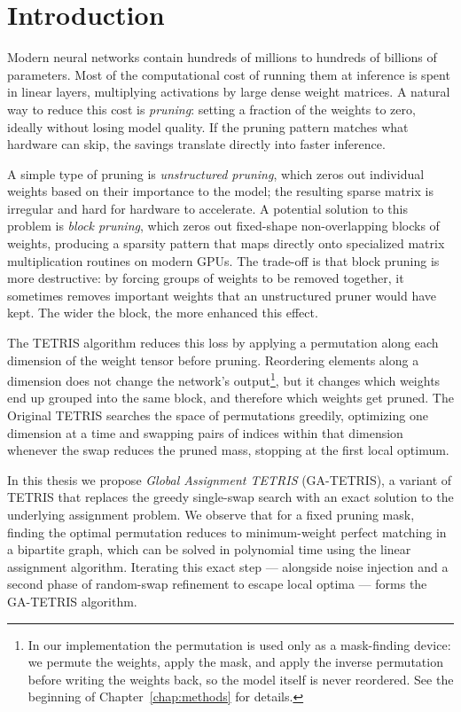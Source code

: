 \chapter*{Introduction} %

Modern neural networks contain hundreds of millions to hundreds of billions of parameters. Most of the computational cost of running them at inference is spent in linear layers, multiplying activations by large dense weight matrices. A natural way to reduce this cost is \emph{pruning}: setting a fraction of the weights to zero, ideally without losing model quality. If the pruning pattern matches what hardware can skip, the savings translate directly into faster inference.

A simple type of pruning is \emph{unstructured pruning}, which zeros out individual weights based on their importance to the model; the resulting sparse matrix is irregular and hard for hardware to accelerate. A potential solution to this problem is \emph{block pruning}, which zeros out fixed-shape non-overlapping blocks of weights, producing a sparsity pattern that maps directly onto specialized matrix multiplication routines on modern GPUs. The trade-off is that block pruning is more destructive: by forcing groups of weights to be removed together, it sometimes removes important weights that an unstructured pruner would have kept. The wider the block, the more enhanced this effect.

The TETRIS algorithm \cite{tetris} reduces this loss by applying a permutation along each dimension of the weight tensor before pruning. Reordering elements along a dimension does not change the network's output\footnote{In our implementation the permutation is used only as a mask-finding device: we permute the weights, apply the mask, and apply the inverse permutation before writing the weights back, so the model itself is never reordered. See the beginning of Chapter~\ref{chap:methods} for details.}, but it changes which weights end up grouped into the same block, and therefore which weights get pruned. The Original TETRIS searches the space of permutations greedily, optimizing one dimension at a time and swapping pairs of indices within that dimension whenever the swap reduces the pruned mass, stopping at the first local optimum.

In this thesis we propose \emph{Global Assignment TETRIS} (GA-TETRIS), a variant of TETRIS that replaces the greedy single-swap search with an exact solution to the underlying assignment problem. We observe that for a fixed pruning mask, finding the optimal permutation reduces to minimum-weight perfect matching in a bipartite graph, which can be solved in polynomial time using the linear assignment algorithm. Iterating this exact step --- alongside noise injection and a second phase of random-swap refinement to escape local optima --- forms the GA-TETRIS algorithm.


